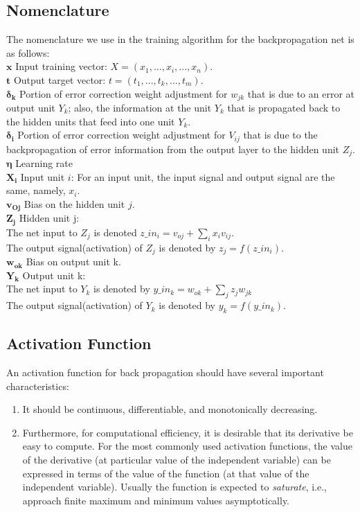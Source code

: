 \subsection{Nomenclature}
The nomenclature we use in the training algorithm for the backpropagation net is as follows: \\
$\mathbold{x}$ \indent Input training vector: $X = (x_1,...,x_i,...,x_n)$. \\
$\mathbold{t}$ \indent Output target vector: $t = (t_1,...,t_k,...,t_m)$. \\ 
$\mathbold{\delta_k}$ \indent Portion of error correction weight adjustment for $w_{jk}$ that is due to an error at output unit $Y_k$; also, the information at the unit $Y_k$ that is propagated back to the hidden units that feed into one unit $Y_k$. \\
$\mathbold{\delta_i}$ \indent Portion of error correction weight adjustment for $V_{ij}$ that is due to the backpropagation of error information from the output layer to the hidden unit $Z_j$. \\
$\mathbold{\eta}$ \indent Learning rate \\
$\mathbold{X_i}$ \indent Input unit $i$: For an input unit, the input signal and output signal are the same, namely, $x_i$. \\
$\mathbold{v_{Oj}}$ \indent Bias on the hidden unit $j$. \\
$\mathbold{Z_j}$ \indent Hidden unit j: \\
\indent \indent The net input to $Z_j$ is denoted $z\_in_i = v_{oj} + \sum_i x_i v_{ij} $. \\
\indent \indent The output signal(activation) of $Z_j$ is denoted by $z_j = f(z\_in_i)$. \\
$\mathbold{w_{ok}}$ Bias on output unit k. \\
$\mathbold{Y_k}$ Output unit k: \\
\indent \indent The net input to $Y_k$ is denoted by $y\_in_k = w_{ok} + \sum_j z_j w_{jk}$ \\
\indent \indent The output signal(activation) of $Y_k$ is denoted by $y_k = f(y\_in_k)$. \\


\subsection{Activation Function}
An activation function for back propagation should have several important characteristics: 
\begin{enumerate}
\item It should be continuous, differentiable, and monotonically decreasing.
\item Furthermore, for computational efficiency, it is desirable that its derivative be easy to compute. 
For the most commonly used activation functions, the value of the derivative (at particular value of the independent variable) can be expressed in terms of the value of the function (at that value of the independent variable). Usually the function is expected to \textit{saturate}, i.e., approach finite maximum and minimum values asymptotically.
\end{enumerate}


